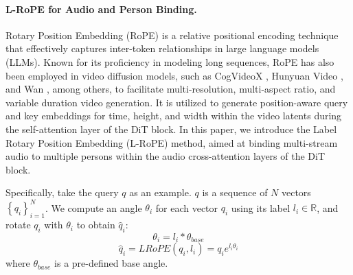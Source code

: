 \documentclass{article}
\begin{document}





\paragraph{L-RoPE for Audio and Person Binding.} 

Rotary Position Embedding (RoPE) \cite{su2024roformer} is a relative positional encoding technique that effectively captures inter-token relationships in large language models (LLMs). Known for its proficiency in modeling long sequences, RoPE has also been employed in video diffusion models, such as CogVideoX \cite{yang2024cogvideox}, Hunyuan Video \cite{kong2024hunyuanvideo}, and Wan \cite{wang2025wan}, among others, to facilitate multi-resolution, multi-aspect ratio, and variable duration video generation. It is utilized to generate position-aware query and key embeddings for time, height, and width within the video latents during the self-attention layer of the DiT block.
In this paper, we introduce the Label Rotary Position Embedding (L-RoPE) method, aimed at binding multi-stream audio to multiple persons within the audio cross-attention layers of the DiT block.

Specifically, take the query $q$ as an example. $q$ is a sequence of $N$ vectors $\left \{q_i  \right \}_{i=1}^N $. We compute an angle $\theta_i$ for each vector $q_i$ using its label $l_i \in \mathbb{R}$, and rotate $q_i$ with $\theta_i$ to obtain $\hat{q}_i$:
\begin{equation}
\theta_{i} = l_i * \theta_{base} 
\end{equation}
\begin{equation}
\hat{q}_i = LRoPE(q_i,l_i)=q_ie^{l_i\theta_i}
\end{equation}
where $\theta_{base}$ is a pre-defined base angle.
\end{document}

